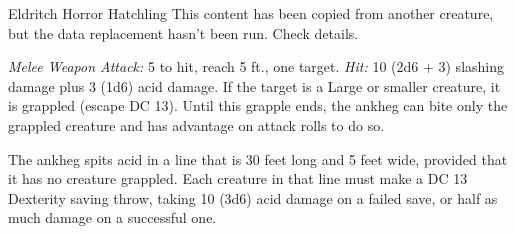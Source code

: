 \documentclass[10pt,a4paper,twoside,bg=print,twocolumn,openany,nodeprecatedcode]{dndbook}
\begin{document}
\begin{DndMonster}[float=t]{Eldritch Horror Hatchling}
\DndMonsterBasics[
armor-class = {14 (natural armor) (11 while prone)},
hit-points = {\DndDice{6d10 + 6}},
speed = {30 ft., burrow 10 ft.}
]
\DndMonsterAbilityScores[
 str = 17,
 dex = 11,
 con = 13,
 int = 1,
 wis = 13,
 cha = 6
]
\DndMonsterDetails[
senses = {darkvision 60 ft., tremorsense 60 ft., passive perception 11},
challenge = 2,
]
This content has been copied from another creature, but the data replacement hasn't been run. Check details.

\textsl{Melee Weapon Attack:} 5 to hit, reach 5 ft., one target. \textsl{Hit:} 10 (2d6 + 3) slashing damage plus 3 (1d6) acid damage. If the target is a Large or smaller creature, it is grappled (escape DC 13). Until this grapple ends, the ankheg can bite only the grappled creature and has advantage on attack rolls to do so.

The ankheg spits acid in a line that is 30 feet long and 5 feet wide, provided that it has no creature grappled. Each creature in that line must make a DC 13 Dexterity saving throw, taking 10 (3d6) acid damage on a failed save, or half as much damage on a successful one.

\end{DndMonster}
\end{document}

